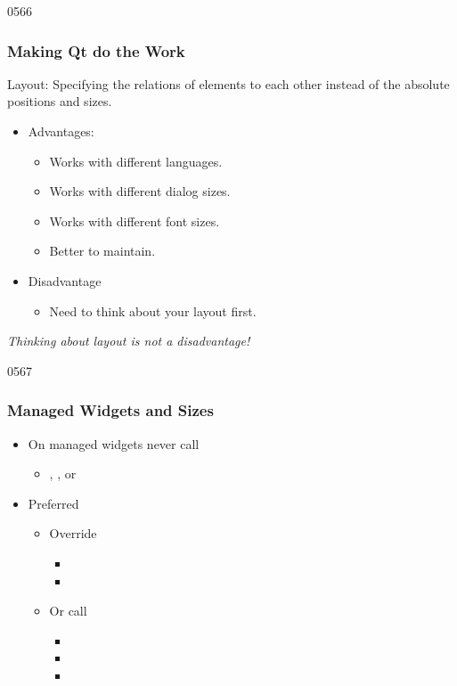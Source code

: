 \begin{slide}{0566}\frametitle{Making Qt do the Work}
\begin{definition}{Layout: }
  Specifying the relations of elements to each other
  instead of the absolute positions and sizes.
\end{definition}    
\begin{itemize}
 \item Advantages: 
    \begin{itemize}
    \item Works with different languages.
    \item Works with different dialog sizes.
    \item Works with different font sizes.
    \item Better to maintain.
   \end{itemize}
  \item Disadvantage
    \begin{itemize}
    \item Need to think about your layout first.
    \end{itemize}
  \end{itemize}
  \vfill
  \textit{Thinking about layout is not a disadvantage!}
\end{slide}
\begin{slide}{0567}\frametitle{Managed Widgets and Sizes}
\begin{itemize}
\item  On managed widgets never call 
  \begin{itemize}
  \item {}, , or
  \end{itemize}
\item Preferred
  \begin{itemize}
  \item Override 
  \begin{itemize}
	  \item {}
	  \item {}
  \end{itemize}
  \item Or call 
  \begin{itemize}
	  \item {}
	  \item {}
	  \item {}
  \end{itemize}
  \end{itemize}
\end{itemize}
\end{slide}

